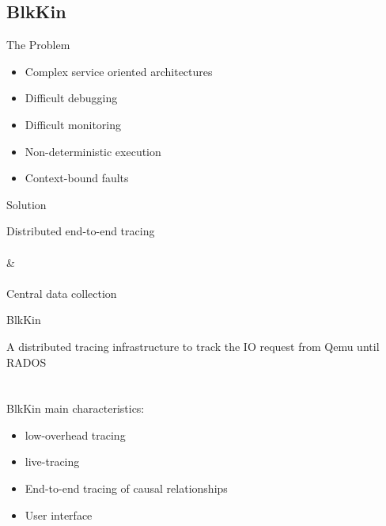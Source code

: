 \subsection{BlkKin}
\begin{frame}{The Problem}
\begin{itemize}
\item Complex service oriented architectures
\item Difficult debugging
\item Difficult monitoring
\item Non-deterministic execution
\item Context-bound faults
\end{itemize}
\end{frame}

\begin{frame}{Solution}
\begin{center}
Distributed end-to-end tracing 
\hfill \\
\hfill \\
 \& 
\hfill \\
\hfill \\
Central data collection
\end{center}
\end{frame}

\begin{frame}{BlkKin}

A distributed tracing infrastructure to track the IO request from Qemu until
RADOS
\hfill \\
\hfill \\
\hfill \\

BlkKin main characteristics:
\begin{itemize}
\item low-overhead tracing 
\item live-tracing
\item End-to-end tracing of causal relationships
\item User interface
\end{itemize}
\end{frame}
